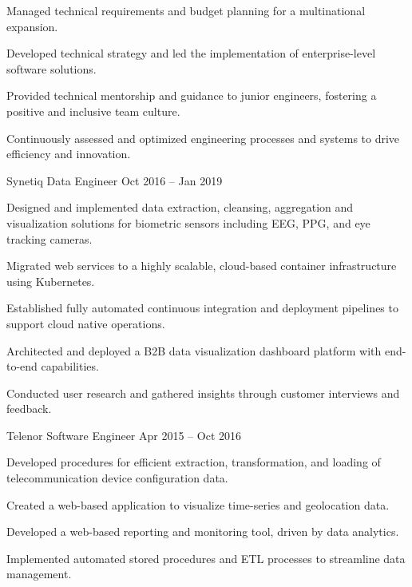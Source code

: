 \documentclass[]{awesome-cv}
\begin{document}
\begin{cventries}
{\begin{cvitems}
		\item {Managed technical requirements and budget planning for a multinational expansion.}
		\item {Developed technical strategy and led the implementation of enterprise-level software solutions.}
		\item {Provided technical mentorship and guidance to junior engineers, fostering a positive and inclusive team culture.}
		\item {Continuously assessed and optimized engineering processes and systems to drive efficiency and innovation.}
		\end{cvitems}}
	\cventry
	{Synetiq}
	{Data Engineer}
	{Oct 2016 – Jan 2019}
	{}
	{\begin{cvitems}
		\item {Designed and implemented data extraction, cleansing, aggregation and visualization solutions for biometric sensors including EEG, PPG, and eye tracking cameras.}
		\item {Migrated web services to a highly scalable, cloud-based container infrastructure using Kubernetes.}
		\item {Established fully automated continuous integration and deployment pipelines to support cloud native operations.}
		\item {Architected and deployed a B2B data visualization dashboard platform with end-to-end capabilities.}
		\item {Conducted user research and gathered insights through customer interviews and feedback.}
		\end{cvitems}}
	\cventry
	{Telenor}
	{Software Engineer}
	{Apr 2015 – Oct 2016}
	{}
	{\begin{cvitems}
		\item {Developed procedures for efficient extraction, transformation, and loading of telecommunication device configuration data.}
		\item {Created a web-based application to visualize time-series and geolocation data.}
		\item {Developed a web-based reporting and monitoring tool, driven by data analytics.}
		\item {Implemented automated stored procedures and ETL processes to streamline data management.}
		\end{cvitems}}
\end{cventries}
\end{document}
